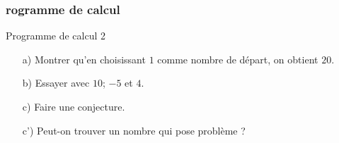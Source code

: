 \documentclass{beamer}
\begin{document}
\begin{frame}
  \frametitle{rogramme de calcul}
  \begin{exampleblock}{Programme de calcul 2}
    
    \begin{multicols}{2}
      
      \begin{enumerate}
      \item[a)] Montrer qu'en choisissant $1$ comme nombre de départ, on obtient $20$.
      \item[b)] Essayer avec $10$; $-5$ et $4$.
      \item[c)] Faire une conjecture.
      \item[c')] Peut-on trouver un nombre qui pose problème ?
      \end{enumerate}
      
    \end{multicols}
  \end{exampleblock}
\end{frame}
\end{document}
